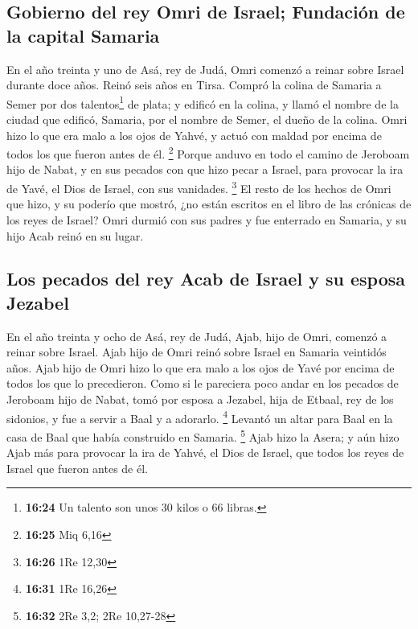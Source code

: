 \begin{paracol}{2}
\hypertarget{gobierno-del-rey-omri-de-israel-fundaciuxf3n-de-la-capital-samaria}{%
\subsection{Gobierno del rey Omri de Israel; Fundación de la capital
Samaria}\label{gobierno-del-rey-omri-de-israel-fundaciuxf3n-de-la-capital-samaria}}

 En el año treinta y uno de Asá, rey de Judá, Omri
comenzó a reinar sobre Israel durante doce años. Reinó seis años en
Tirsa.  Compró la colina de Samaria a Semer por dos
talentos\footnote{\textbf{16:24} Un talento son unos 30 kilos o 66
  libras.} de plata; y edificó en la colina, y llamó el nombre de la
ciudad que edificó, Samaria, por el nombre de Semer, el dueño de la
colina.  Omri hizo lo que era malo a los ojos de Yahvé, y
actuó con maldad por encima de todos los que fueron antes de él.
\footnote{\textbf{16:25} Miq 6,16}  Porque anduvo en todo
el camino de Jeroboam hijo de Nabat, y en sus pecados con que hizo pecar
a Israel, para provocar la ira de Yavé, el Dios de Israel, con sus
vanidades. \footnote{\textbf{16:26} 1Re 12,30}  El resto
de los hechos de Omri que hizo, y su poderío que mostró, ¿no están
escritos en el libro de las crónicas de los reyes de Israel?
 Omri durmió con sus padres y fue enterrado en Samaria, y
su hijo Acab reinó en su lugar.

\hypertarget{los-pecados-del-rey-acab-de-israel-y-su-esposa-jezabel}{%
\subsection{Los pecados del rey Acab de Israel y su esposa
Jezabel}\label{los-pecados-del-rey-acab-de-israel-y-su-esposa-jezabel}}

 En el año treinta y ocho de Asá, rey de Judá, Ajab, hijo
de Omri, comenzó a reinar sobre Israel. Ajab hijo de Omri reinó sobre
Israel en Samaria veintidós años.  Ajab hijo de Omri hizo
lo que era malo a los ojos de Yavé por encima de todos los que lo
precedieron.  Como si le pareciera poco andar en los
pecados de Jeroboam hijo de Nabat, tomó por esposa a Jezabel, hija de
Etbaal, rey de los sidonios, y fue a servir a Baal y a adorarlo.
\footnote{\textbf{16:31} 1Re 16,26}  Levantó un altar
para Baal en la casa de Baal que había construido en Samaria.
\footnote{\textbf{16:32} 2Re 3,2; 2Re 10,27-28}  Ajab
hizo la Asera; y aún hizo Ajab más para provocar la ira de Yahvé, el
Dios de Israel, que todos los reyes de Israel que fueron antes de él.


\end{paracol}
